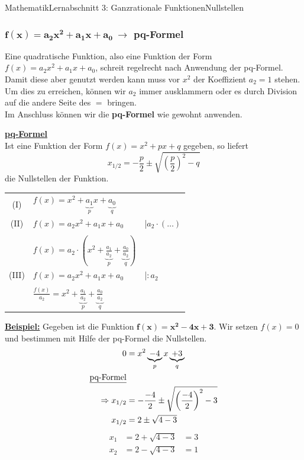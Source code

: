 \documentclass[11pt,twocolumn,oneside,openany,headings=optiontotoc,11pt,numbers=noenddot]{article}
\begin{document}
\begin{worksheet}{Mathematik}{Lernabschnitt 3: Ganzrationale Funktionen}{Nullstellen}
		\subsubsection{\(\mathbf{f(x) = a_2x^2+a_1x+a_0}\ \rightarrow\) pq-Formel}
		Eine quadratische Funktion, also eine Funktion der Form \(f(x) = a_2x^2+a_1x+a_0\), schreit regelrecht nach Anwendung der pq-Formel.\\
		Damit diese aber genutzt werden kann muss vor \(x^2\) der Koeffizient \(a_2 = 1\) stehen.\\
		Um dies zu erreichen, können wir \(a_2\) immer ausklammern oder es durch Division auf die andere Seite des \(=\) bringen.\\
		Im Anschluss können wir die \textbf{pq-Formel} wie gewohnt anwenden.\\
		\begin{framed}
			\noindent
			\underline{\textbf{pq-Formel}}\\
			Ist eine Funktion der Form \(f(x) = x^2 + px + q\) gegeben, so liefert \[x_{1/2} = -\frac{p}{2}\pm \sqrt{\left(\frac{p}{2}\right)^2 - q}\] die Nullstellen der Funktion.
		\end{framed}
	 	\par\noindent
	 	\begin{tabularx}{0.48\textwidth}{cXl}
	 		(I) & \(f(x) = x^2 + \underbrace{a_1}_{p}x + \underbrace{a_0}_{q}\) &\\
	 		(II) & \(f(x) = a_2x^2 + a_1x + a_0\) & |\(a_2\cdot(\ldots)\)\\
	 		\\
	 		& \(f(x) = a_2\cdot(x^2 + \underbrace{\frac{a_1}{a_2}}_{p} + \underbrace{\frac{a_0}{a_2}}_{q})\)\\
	 		(III) & \(f(x) = a_2x^2 + a_1x + a_0\) & |\(:a_2\)\\
	 		\\
	 		& \(\frac{f(x)}{a_2} = x^2 + \underbrace{\frac{a_1}{a_2}}_{p} + \underbrace{\frac{a_0}{a_2}}_{q}\) & \\
	 	\end{tabularx}
		\noindent
		\underline{\textbf{Beispiel:}} Gegeben ist die Funktion \(\mathbf{f(x) = x^2 -4x + 3}\). Wir setzen \(f(x) = 0\) und bestimmen mit Hilfe der pq-Formel die Nullstellen.
		\begin{align*}
			0 & = x^2 \underbrace{- 4}_{p}x \underbrace{+ 3}_{q}\\
			\text{\underline{pq-Formel}}\\
			\Rightarrow x_{1/2} & = -\frac{-4}{2} \pm \sqrt{\left(\frac{-4}{2}\right)^2 - 3}\\
			x_{1/2} & = 2 \pm \sqrt{4 - 3}\\
		\end{align*}
		\begin{align*}
			x_1 & = 2 + \sqrt{4 - 3} & = 3\\
			x_2 & = 2 - \sqrt{4 - 3} & = 1\\\\
		\end{align*}

\end{worksheet}
\end{document}

